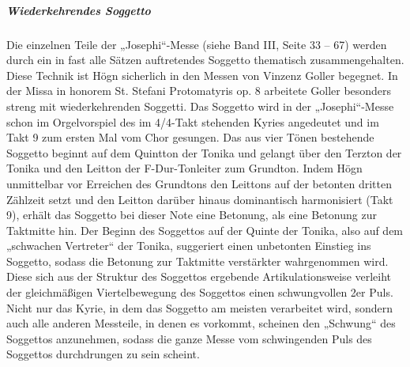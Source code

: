 \clearpage\subparagraph{Wiederkehrendes Soggetto}
Die einzelnen Teile der „Josephi“-Messe (siehe Band III, Seite 33 – 67)
werden durch ein in fast alle Sätzen auftretendes Soggetto thematisch
zusammengehalten. Diese Technik ist Högn sicherlich in den Messen von
Vinzenz Goller begegnet. In der Missa in honorem St. Stefani
Protomatyris op. 8 arbeitete Goller besonders streng mit
wiederkehrenden Soggetti. Das Soggetto wird in der „Josephi“-Messe
schon im Orgelvorspiel des im 4/4-Takt stehenden Kyries angedeutet und
im Takt 9 zum ersten Mal vom Chor gesungen. Das aus vier Tönen
bestehende Soggetto beginnt auf dem Quintton der Tonika und gelangt
über den Terzton der Tonika und den Leitton der F-Dur-Tonleiter zum
Grundton. Indem Högn unmittelbar vor Erreichen des Grundtons den
Leittons auf der betonten dritten Zählzeit setzt und den Leitton
darüber hinaus dominantisch harmonisiert (Takt 9), erhält das Soggetto
bei dieser Note eine Betonung, als eine Betonung zur Taktmitte hin. Der
Beginn des Soggettos auf der Quinte der Tonika, also auf dem „schwachen
Vertreter“ der Tonika, suggeriert einen unbetonten Einstieg ins
Soggetto, sodass die Betonung zur Taktmitte verstärkter wahrgenommen
wird. Diese sich aus der Struktur des Soggettos ergebende
Artikulationsweise verleiht der gleichmäßigen Viertelbewegung des
Soggettos einen schwungvollen 2er Puls. Nicht nur das Kyrie, in dem das
Soggetto am meisten verarbeitet wird, sondern auch alle anderen
Messteile, in denen es vorkommt, scheinen den „Schwung“ des Soggettos
anzunehmen, sodass die ganze Messe vom schwingenden Puls des Soggettos
durchdrungen zu sein scheint.


